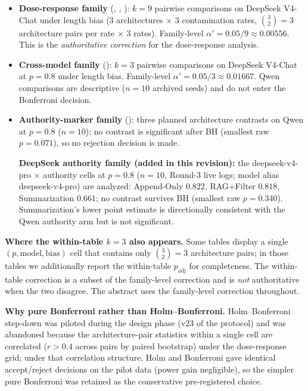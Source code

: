 \documentclass[11pt]{article}
\begin{document}
\begin{itemize}[nosep]
    \item \textbf{Dose-response family} (, , ): $k = 9$ pairwise comparisons on DeepSeek V4-Chat under length bias ($3$ architectures $\times$ $3$ contamination rates, $\binom{3}{2}=3$ architecture pairs per rate $\times$ $3$ rates). Family-level $\alpha' = 0.05/9 \approx 0.00556$. This is the \emph{authoritative correction} for the dose-response analysis.
    \item \textbf{Cross-model family} (): $k = 3$ pairwise comparisons on DeepSeek V4-Chat at $p=0.8$ under length bias. Family-level $\alpha' = 0.05/3 \approx 0.01667$. Qwen comparisons are descriptive ($n=10$ archived seeds) and do not enter the Bonferroni decision.
    \item \textbf{Authority-marker family} (): three planned architecture contrasts on Qwen at $p=0.8$ ($n=10$); no contrast is significant after BH (smallest raw $p = 0.071$), so no rejection decision is made.\par\smallskip\noindent \textbf{DeepSeek authority family (added in this revision):} the deepseek-v4-pro $\times$ authority cells at $p=0.8$ ($n=10$, Round-3 live logs; model alias deepseek-v4-pro) are analyzed: Append-Only $0.822$, RAG+Filter $0.818$, Summarization $0.661$; no contrast survives BH (smallest raw $p = 0.340$). Summarization's lower point estimate is directionally consistent with the Qwen authority arm but is not significant.
\end{itemize}

\textbf{Where the within-table $k=3$ also appears.} Some tables display a single $(p, \text{model}, \text{bias})$ cell that contains only $\binom{3}{2}=3$ architecture pairs; in those tables we additionally report the within-table $p_{\text{adj}}$ for completeness. The within-table correction is a subset of the family-level correction and is \emph{not} authoritative when the two disagree. The abstract uses the family-level correction throughout.

\textbf{Why pure Bonferroni rather than Holm--Bonferroni.} Holm--Bonferroni step-down was piloted during the design phase (v23 of the protocol) and was abandoned because the architecture-pair statistics within a single cell are correlated ($r > 0.4$ across pairs by paired bootstrap) under the dose-response grid; under that correlation structure, Holm and Bonferroni gave identical accept/reject decisions on the pilot data (power gain negligible), so the simpler pure Bonferroni was retained as the conservative pre-registered choice.
\end{document}
